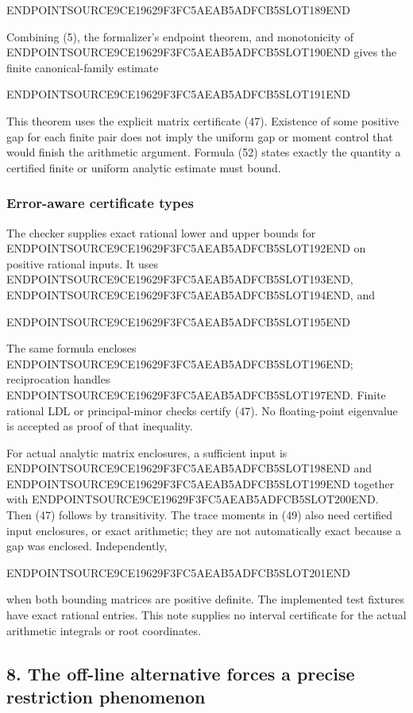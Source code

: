 ENDPOINTSOURCE9CE19629F3FC5AEAB5ADFCB5SLOT189END

Combining (5), the formalizer's endpoint theorem, and monotonicity of ENDPOINTSOURCE9CE19629F3FC5AEAB5ADFCB5SLOT190END gives the finite canonical-family estimate

ENDPOINTSOURCE9CE19629F3FC5AEAB5ADFCB5SLOT191END

This theorem uses the explicit matrix certificate (47). Existence of some positive gap for each finite pair does not imply the uniform gap or moment control that would finish the arithmetic argument. Formula (52) states exactly the quantity a certified finite or uniform analytic estimate must bound.

\subsubsection{Error-aware certificate types}\label{endpoint-restriction_original--error-aware-certificate-types}

The checker supplies exact rational lower and upper bounds for ENDPOINTSOURCE9CE19629F3FC5AEAB5ADFCB5SLOT192END on positive rational inputs. It uses ENDPOINTSOURCE9CE19629F3FC5AEAB5ADFCB5SLOT193END, ENDPOINTSOURCE9CE19629F3FC5AEAB5ADFCB5SLOT194END, and

ENDPOINTSOURCE9CE19629F3FC5AEAB5ADFCB5SLOT195END

The same formula encloses ENDPOINTSOURCE9CE19629F3FC5AEAB5ADFCB5SLOT196END; reciprocation handles ENDPOINTSOURCE9CE19629F3FC5AEAB5ADFCB5SLOT197END. Finite rational LDL or principal-minor checks certify (47). No floating-point eigenvalue is accepted as proof of that inequality.

For actual analytic matrix enclosures, a sufficient input is ENDPOINTSOURCE9CE19629F3FC5AEAB5ADFCB5SLOT198END and ENDPOINTSOURCE9CE19629F3FC5AEAB5ADFCB5SLOT199END together with ENDPOINTSOURCE9CE19629F3FC5AEAB5ADFCB5SLOT200END. Then (47) follows by transitivity. The trace moments in (49) also need certified input enclosures, or exact arithmetic; they are not automatically exact because a gap was enclosed. Independently,

ENDPOINTSOURCE9CE19629F3FC5AEAB5ADFCB5SLOT201END

when both bounding matrices are positive definite. The implemented test fixtures have exact rational entries. This note supplies no interval certificate for the actual arithmetic integrals or root coordinates.

\subsection{8. The off-line alternative forces a precise restriction phenomenon}\label{endpoint-restriction_original--the-off-line-alternative-forces-a-precise-restriction-phenomenon}

